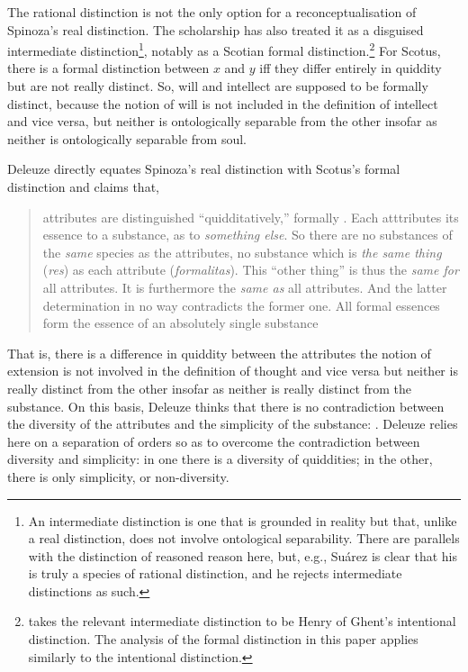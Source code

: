 \documentclass[11pt]{article}
\newcommand{\dash}{\unskip{---}}
\newcommand\foreign[2]{\foreignlanguage{#1}{\emph{#2}}}
\begin{document}
	The rational distinction is not the only option for a reconceptualisation of Spinoza's real distinction. The scholarship has also treated it as a disguised intermediate distinction\footnote{An intermediate distinction is one that is grounded in reality but that, unlike a real distinction, does not involve ontological separability. There are parallels with the distinction of reasoned reason here, but, e.g., Suárez is clear that his is truly a species of rational distinction, and he rejects intermediate distinctions as such.}, notably as a Scotian formal distinction.\footnote{\textcite{WallerSpinozaIntermediate} takes the relevant intermediate distinction to be Henry of Ghent's intentional distinction. The analysis of the formal distinction in this paper applies similarly to the intentional distinction.} For Scotus, there is a formal distinction between $x$ and $y$ iff they differ entirely in quiddity but are not really distinct. So, will and intellect are supposed to be formally distinct, because the notion of will is not included in the definition of intellect and vice versa, but neither is ontologically separable from the other insofar as neither is ontologically separable from soul.
	
	Deleuze directly equates Spinoza's real distinction with Scotus's formal distinction \citeyearpar[37--39]{DeleuzeExpressionism} and claims that,
		\blockcquote[65--66]{DeleuzeExpressionism}[.]{
			attributes are distinguished \enquote{quidditatively,} formally \textelp{}. Each atttributes its essence to a substance, as to \emph{something else}. \textelp{} So there are no substances of the \emph{same} species as the attributes, no substance which is \emph{the same thing} (\foreign{latin}{res}) as each attribute (\foreign{latin}{formalitas}). \textelp{} This \enquote{other thing} is thus the \emph{same for} all attributes. It is furthermore the \emph{same as} all attributes. And the latter determination in no way contradicts the former one. \textelp{} All formal essences form the essence of an absolutely single substance}
	That is, there is a difference in quiddity between the attributes \dash the notion of extension is not involved in the definition of thought and vice versa \dash but neither is really distinct from the other insofar as neither is really distinct from the substance. \label{DeleuzeOnOrders}On this basis, Deleuze thinks that there is no contradiction between the diversity of the attributes and the simplicity of the substance: . Deleuze relies here on a separation of orders so as to overcome the contradiction between diversity and simplicity: in one there is a diversity of quiddities; in the other, there is only simplicity, or non-diversity.
	
\end{document}
